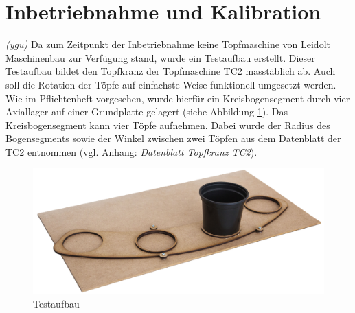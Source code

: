 \newpage
\section{Inbetriebnahme und Kalibration}
\label{inbetriebnahme}
\textit{(ygu)} Da zum Zeitpunkt der Inbetriebnahme keine Topfmaschine von Leidolt Maschinenbau zur Verfügung stand, wurde ein Testaufbau erstellt. Dieser Testaufbau bildet den Topfkranz der Topfmaschine TC2 masstäblich ab. Auch soll die Rotation der Töpfe auf einfachste Weise funktionell umgesetzt werden. Wie im Pflichtenheft vorgesehen, wurde hierfür ein Kreisbogensegment durch vier Axiallager auf einer Grundplatte gelagert (siehe Abbildung \ref{fig:testaufbau}). Das Kreisbogensegment kann vier Töpfe aufnehmen. Dabei wurde der Radius des Bogensegments sowie der Winkel zwischen zwei Töpfen aus dem Datenblatt der TC2 entnommen (vgl. Anhang: \textit{Datenblatt Topfkranz TC2}). 

\begin{figure}[H]
	\includegraphics[draft=false,width=1\textwidth]{Illustrationen/7-Inbetriebnahme_und_Kalibration/Testaufbau_1.png}
	\caption{Testaufbau}
	\label{fig:testaufbau}
\end{figure}

